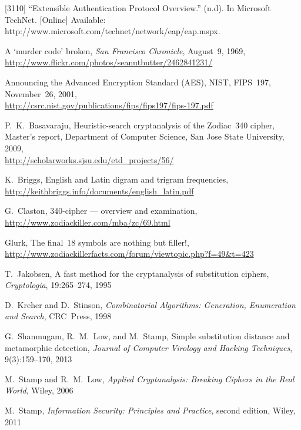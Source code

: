 %
%
%
%
\begin{thebibliography}{10}

[3110] “Extensible Authentication Protocol Overview.” (n.d). In 
Microsoft TechNet. [Online] Available: 
http://www.microsoft.com/technet/network/eap/eap.mspx. 

 A `murder code' broken, {\it San Francisco Chronicle}, August~9, 1969,\\
\url{http://www.flickr.com/photos/seanutbutter/2462841231/}

 Announcing the Advanced Encryption Standard (AES), NIST, 
FIPS~197, November~26, 2001,\\
\url{http://csrc.nist.gov/publications/fips/fips197/fips-197.pdf}

 P.~K.~Basavaraju, Heuristic-search cryptanalysis of the Zodiac~340 cipher,
Master's report, Department of Computer Science, San Jose State University, 2009,\\
\url{http://scholarworks.sjsu.edu/etd_projects/56/}

 K.~Briggs, English and Latin digram and trigram frequencies,\\
\url{http://keithbriggs.info/documents/english_latin.pdf}

 G.~Claston, 340-cipher --- overview and examination,\\
\url{http://www.zodiackiller.com/mba/zc/69.html}

 Glurk, The final~18 symbols are nothing but filler!,\\
\url{http://www.zodiackillerfacts.com/forum/viewtopic.php?f=49&t=423}

 T.~Jakobsen, A fast method for the cryptanalysis of substitution ciphers,
{\it Cryptologia}, 19:265--274, 1995

 D.~Kreher and D.~Stinson, {\it Combinatorial Algorithms: 
Generation, Enumeration and Search}, CRC~Press, 1998

 G.~Shanmugam, R.~M.~Low, and M.~Stamp, 
Simple substitution distance and metamorphic detection,
{\it Journal of Computer Virology and Hacking Techniques},  9(3):159--170, 2013

 M.~Stamp and R.~M.~Low, {\it Applied Cryptanalysis: Breaking Ciphers 
in the Real World}, Wiley, 2006

 M.~Stamp, {\it Information Security: Principles and Practice}, second edition, 
Wiley, 2011

\end{thebibliography}
